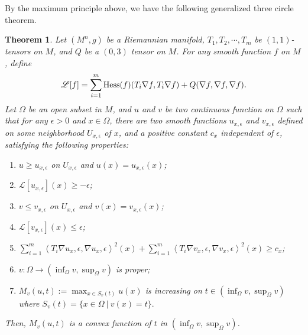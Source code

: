 \documentclass[12pt]{amsart}
\def\e{\epsilon}
\def\vv<#1,#2>{\left\langle#1,#2\right\rangle}
\newtheorem{thm}{Theorem}[section]
\theoremstyle{definition}
\theoremstyle{remark}
\numberwithin{equation}{section}
\def\Hess{{\rm Hess}}
\begin{document}
By the maximum principle above, we have the following generalized three circle theorem.
\begin{thm}\label{thm-general-three-circle}
Let $(M^n,g)$ be a Riemannian manifold, $T_1,T_2,\cdots, T_m$ be $(1,1)$-tensors on $M$, and $Q$ be a $(0,3)$ tensor on $M$. For any smooth function $f$ on $M$, define
\begin{equation}
\mathscr{L}[f]=\sum_{i=1}^m\Hess(f)(T_i\nabla f,T_i\nabla f)+Q(\nabla f,\nabla f,\nabla f).
\end{equation}
Let $\Omega$ be an open subset in $M$, and $u$ and $v$ be two continuous function on $\Omega$ such that for any $\e>0$ and $x\in \Omega$, there are two smooth functions $u_{x,\e}$ and $v_{x,\e}$ defined on some neighborhood $U_{x,\e}$ of $x$, and a positive constant $c_x$ independent of $\e$, satisfying the following properties:
\begin{enumerate}
\item $u\geq u_{x,\e}$ on $U_{x,\e}$ and $u(x)=u_{x,\e}(x)$;
\item $\mathscr{L}[u_{x,\e}](x)\geq-\e$;
\item $v\leq v_{x,\e}$ on $U_{x,\e}$ and $v(x)=v_{x,\e}(x)$;
\item $\mathscr{L}[v_{x,\e}](x)\leq \e$;
\item $\sum_{i=1}^m\vv<T_i\nabla u_{x,\e},\nabla u_{x,\e}>^2(x)+\sum_{i=1}^m\vv<T_i\nabla v_{x,\e},\nabla v_{x,\e}>^2(x)\geq c_x$;
\item $v:\Omega\to (\inf_\Omega v,\sup_\Omega v)$ is proper;
\item $M_v(u,t):=\max_{x\in S_v(t)}u(x)$ is increasing on $t\in (\inf_\Omega v,\sup_\Omega v)$ where $S_v(t)=\{x\in\Omega\ |\ v(x)=t\}.$
\end{enumerate}
Then, $M_v(u,t)$ is a convex function of $t$ in $(\inf_\Omega v,\sup_\Omega v)$.
\end{thm}
\end{document}
